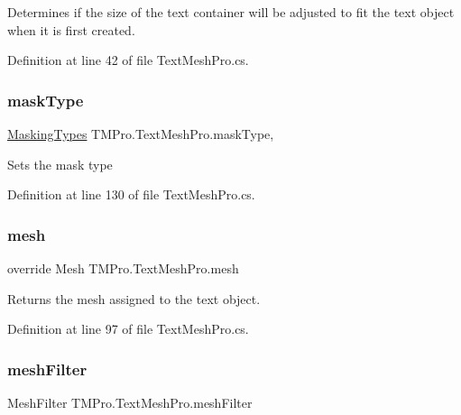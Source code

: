 Determines if the size of the text container will be adjusted to fit the text object when it is first created. 



Definition at line 42 of file Text\+Mesh\+Pro.\+cs.

\mbox{\label{class_t_m_pro_1_1_text_mesh_pro_a9292c0fdebb6a1cdd791ced222eb5f89}} 
\subsubsection{\texorpdfstring{maskType}{maskType}}
{\footnotesize\ttfamily \mbox{\hyperlink{namespace_t_m_pro_adca59e3caf7e75b8dfdcac4f70a31987}{Masking\+Types}} T\+M\+Pro.\+Text\+Mesh\+Pro.\+mask\+Type\hspace{0.3cm}{\ttfamily [get]}, {\ttfamily [set]}}



Sets the mask type 



Definition at line 130 of file Text\+Mesh\+Pro.\+cs.

\mbox{\label{class_t_m_pro_1_1_text_mesh_pro_a2d197f964234bb89563b06b4614168f5}} 
\subsubsection{\texorpdfstring{mesh}{mesh}}
{\footnotesize\ttfamily override Mesh T\+M\+Pro.\+Text\+Mesh\+Pro.\+mesh\hspace{0.3cm}{\ttfamily [get]}}



Returns the mesh assigned to the text object. 



Definition at line 97 of file Text\+Mesh\+Pro.\+cs.

\mbox{\label{class_t_m_pro_1_1_text_mesh_pro_a65b105c9a53bbcf8a45e19d1bbff146f}} 
\subsubsection{\texorpdfstring{meshFilter}{meshFilter}}
{\footnotesize\ttfamily Mesh\+Filter T\+M\+Pro.\+Text\+Mesh\+Pro.\+mesh\+Filter\hspace{0.3cm}{\ttfamily [get]}}



